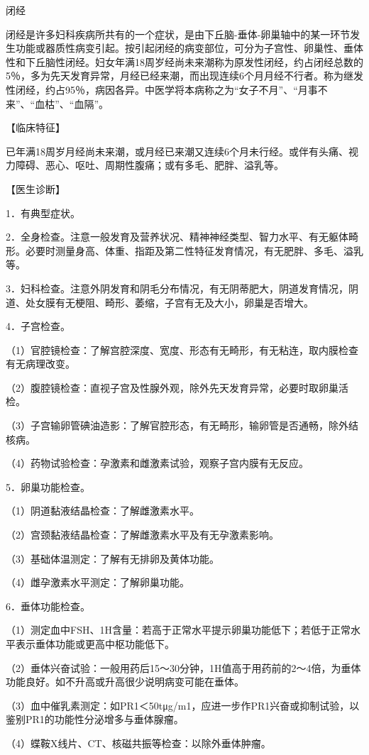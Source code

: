 \documentclass[12pt,UTF8]{ctexbook}
\begin{document}
闭经


闭经是许多妇科疾病所共有的一个症状，是由下丘脑-垂体-卵巢轴中的某一环节发生功能或器质性病变引起。按引起闭经的病变部位，可分为子宫性、卵巢性、垂体性和下丘脑性闭经。妇女年满18周岁经尚未来潮称为原发性闭经，约占闭经总数的5％，多为先天发育异常，月经已经来潮，而出现连续6个月月经不行者。称为继发性闭经，约占95％，病因各异。中医学将本病称之为“女子不月”、“月事不来”、“血枯”、“血隔”。

【临床特征】

已年满18周岁月经尚未来潮，或月经已来潮又连续6个月未行经。或伴有头痛、视力障碍、恶心、呕吐、周期性腹痛；或有多毛、肥胖、溢乳等。

【医生诊断】

1．有典型症状。

2．全身检查。注意一般发育及营养状况、精神神经类型、智力水平、有无躯体畸形。必要时测量身高、体重、指距及第二性特征发育情况，有无肥胖、多毛、溢乳等。

3．妇科检查。注意外阴发育和阴毛分布情况，有无阴蒂肥大，阴道发育情况，阴道、处女膜有无梗阻、畸形、萎缩，子宫有无及大小，卵巢是否增大。

4．子宫检查。

（1）官腔镜检查：了解宫腔深度、宽度、形态有无畸形，有无粘连，取内膜检查有无病理改变。

（2）腹腔镜检查：直视子宫及性腺外观，除外先天发育异常，必要时取卵巢活检。

（3）子宫输卵管碘油造影：了解官腔形态，有无畸形，输卵管是否通畅，除外结核病。

（4）药物试验检查：孕激素和雌激素试验，观察子宫内膜有无反应。

5．卵巢功能检查。

（1）阴道黏液结晶检查：了解雌激素水平。

（2）宫颈黏液结晶检查：了解雌激素水平及有无孕激素影响。

（3）基础体温测定：了解有无排卵及黄体功能。

（4）雌孕激素水平测定：了解卵巢功能。

6．垂体功能检查。

（1）测定血中FSH、1H含量：若高于正常水平提示卵巢功能低下；若低于正常水平表示垂体功能或更高中枢功能低下。

（2）垂体兴奋试验：一般用药后15～30分钟，1H值高于用药前的2～4倍，为垂体功能良好。如不升高或升高很少说明病变可能在垂体。

（3）血中催乳素测定：如PR1＜50tμg/m1，应进一步作PR1兴奋或抑制试验，以鉴别PR1的功能性分泌增多与垂体腺瘤。

（4）蝶鞍X线片、CT、核磁共振等检查：以除外垂体肿瘤。
\end{document}
